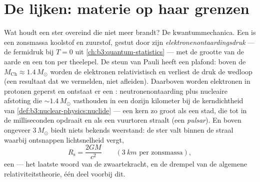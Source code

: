 \section{De lijken: materie op haar grenzen}

\begin{proposition}\label{prop:b3:astrophysics:compact}
Wat houdt een ster overeind die niet meer brandt? De kwantummechanica. Een
\emph{} is een zonsmassa koolstof en zuurstof, gestut
door zijn \emph{elektronenontaardingsdruk} --- de fermidruk bij $T = 0$
uit \cref{ch:b3:quantum-statistics} --- met de grootte
van de aarde en een ton per theelepel. De steun van Pauli heeft een
plafond: boven de \emph{} $M_{\text{Ch}}
\approx 1.4\,M_\odot$ worden de elektronen relativistisch en verliest de
druk de wedloop (een resultaat dat we vermelden, niet afleiden). Daarboven
worden elektronen in protonen geperst en ontstaat er een \emph{}:
neutronenontaarding plus nucleaire afstoting die
$\sim1.4\,M_\odot$ vasthouden in een dozijn kilometer bij de
kerndichtheid van \cref{def:b3:nuclear-physics:nuclide} --- een
kern zo groot als een stad, die tot in de milliseconden opdraait en als
een vuurtoren straalt (een \emph{pulsar}). En boven ongeveer $3\,M_\odot$
biedt niets bekends weerstand: de ster valt binnen de straal waarbij
ontsnappen lichtsnelheid vergt,
\[
R_{\text{s}} = \frac{2GM}{c^2}
\qquad (\qty{3}{km}\text{ per zonsmassa}) ,
\]
een \emph{} --- het laatste woord van de zwaartekracht, en de drempel
van de algemene relativiteitstheorie, één deel voorbij dit.
\end{proposition}
\admitted

